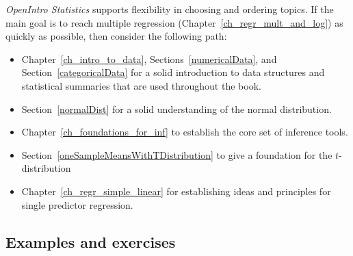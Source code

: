 \noindent%
\emph{OpenIntro Statistics} supports flexibility
in choosing and ordering topics.
If the main goal is to reach multiple regression
(Chapter~\ref{ch_regr_mult_and_log})
as quickly as possible, then consider the
following path:
\begin{itemize}
\setlength{\itemsep}{0mm}
\item Chapter~\ref{ch_intro_to_data},
    Sections~\ref{numericalData},
    and Section~\ref{categoricalData} for a solid
    introduction to data structures and statistical
    summaries that are used throughout the book.
\item Section~\ref{normalDist}
    for a solid understanding of the normal distribution.
\item Chapter~\ref{ch_foundations_for_inf}
    to establish the core set of inference tools.
%    
%    
\item Section~\ref{oneSampleMeansWithTDistribution}
    to give a foundation for the $t$-distribution
\item Chapter~\ref{ch_regr_simple_linear}
    for establishing ideas and principles for single
    predictor regression.
\end{itemize}


\subsection*{Examples and exercises}

